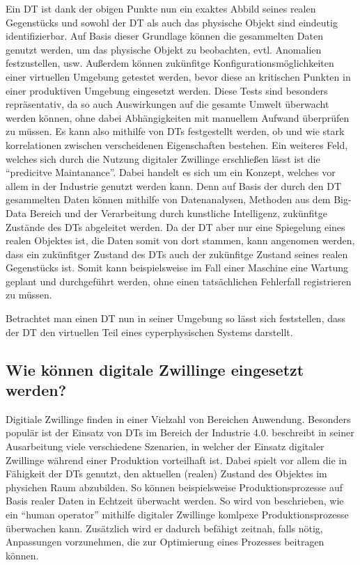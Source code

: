 Ein \ac{DT} ist dank der obigen Punkte nun ein exaktes Abbild seines realen Gegenstücks und sowohl der \ac{DT} als auch das physische Objekt sind eindeutig identifizierbar. Auf Basis dieser Grundlage können die gesammelten Daten genutzt werden, um das physische Objekt zu beobachten, evtl. Anomalien festzustellen, usw. Außerdem können zukünfitge Konfigurationsmöglichkeiten einer virtuellen Umgebung getestet werden, bevor diese an kritischen Punkten in einer produktiven Umgebung eingesetzt werden. Diese Tests sind besonders repräsentativ, da so auch Auswirkungen auf die gesamte Umwelt überwacht werden können, ohne dabei Abhängigkeiten mit manuellem Aufwand überprüfen zu müssen. Es kann also mithilfe von \ac{DT}s festgestellt werden, ob und wie stark korrelationen zwischen verscheidenen Eigenschaften bestehen. Ein weiteres Feld, welches sich durch die Nutzung digitaler Zwillinge erschließen lässt ist die \enquote{predicitve Maintanance}. Dabei handelt es sich um ein Konzept, welches vor allem in der Industrie genutzt werden kann. Denn auf Basis der durch den \ac{DT} gesammelten Daten können mithilfe von Datenanalysen, Methoden aus dem Big-Data Bereich und der Verarbeitung durch kunstliche Intelligenz, zukünfitge Zustände des \ac{DT}s abgeleitet werden. Da der \ac{DT} aber nur eine Spiegelung eines realen Objektes ist, die Daten somit von dort stammen, kann angenomen werden, dass ein zukünfitger Zustand des \ac{DT}s auch der zukünfitge Zustand seines realen Gegenstücks ist. Somit kann beispielsweise im Fall einer Maschine eine Wartung geplant und durchgeführt werden, ohne einen tatsächlichen Fehlerfall registrieren zu müssen.

Betrachtet man einen \ac{DT} nun in seiner Umgebung so lässt sich feststellen, dass der \ac{DT} den virtuellen Teil eines cyperphysischen Systems darstellt.

\subsection{Wie können digitale Zwillinge eingesetzt werden?}

Digitiale Zwillinge finden in einer Vielzahl von Bereichen Anwendung. Besonders populär ist der Einsatz von \ac{DT}s im Bereich der Industrie 4.0. \citeauthor{tao2018digital} beschreibt in seiner Ausarbeitung viele verschiedene Szenarien, in welcher der Einsatz digitaler Zwillinge während einer Produktion vorteilhaft ist. Dabei spielt vor allem die in Fähigkeit der \ac{DT}s genutzt, den aktuellen (realen) Zustand des Objektes im physichen Raum abzubilden. So können beispielsweise Produktionsprozesse auf Basis realer Daten in Echtzeit überwacht werden. \autocite{tao2018digital} So wird von \citeauthor{weyer2016future} beschrieben, wie ein \enquote{human operator} mithilfe digitaler Zwillinge komlpexe Produktionsprozesse überwachen kann. Zusätzlich wird er dadurch befähigt zeitnah, falls nötig, Anpassungen vorzunehmen, die zur Optimierung eines Prozesses beitragen können.\autocite{weyer2016future}

